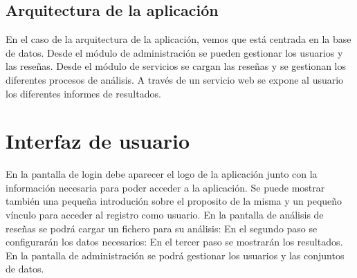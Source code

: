 \subsection{Arquitectura de la aplicación}

En el caso de la arquitectura de la aplicación, vemos que está centrada en la base de datos.
Desde el módulo de administración se pueden gestionar los usuarios y las reseñas.
Desde el módulo de servicios se cargan las reseñas y se gestionan los diferentes procesos de análisis.
A través de un servicio web se expone al usuario los diferentes informes de resultados.


\newpage

\section{Interfaz de usuario}
En la pantalla de login debe aparecer el logo de la aplicación 
junto con la información necesaria para poder acceder a la aplicación.
Se puede mostrar también una pequeña introdución sobre el proposito de la misma y 
un pequeño vínculo para acceder al registro como usuario.
En la pantalla de análisis de reseñas se podrá cargar un fichero para su análisis:
En el segundo paso se configurarán los datos necesarios:
En el tercer paso se mostrarán los resultados.
En la pantalla de administración se podrá gestionar los usuarios y las conjuntos de datos.
